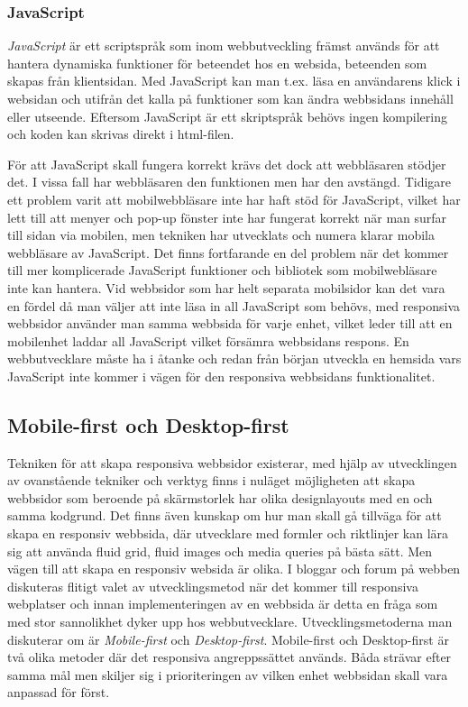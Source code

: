 \documentclass[11pt]{article}
\begin{document}
\subsubsection{JavaScript}
\textit{JavaScript} är ett scriptspråk som inom webbutveckling främst används för att hantera dynamiska funktioner för beteendet hos en websida, beteenden som skapas från klientsidan. Med JavaScript kan man t.ex. läsa en användarens klick i websidan och utifrån det kalla på funktioner som kan ändra webbsidans innehåll eller utseende. Eftersom JavaScript är ett skriptspråk behövs ingen kompilering och koden kan skrivas direkt i html-filen.

För att JavaScript skall fungera korrekt krävs det dock att webbläsaren stödjer det. I vissa fall har webbläsaren den funktionen men har den avstängd. Tidigare ett problem varit att mobilwebbläsare inte har haft stöd för JavaScript, vilket har lett till att menyer och pop-up fönster inte har fungerat korrekt när man surfar till sidan via mobilen, men tekniken har utvecklats och numera klarar mobila webbläsare av JavaScript. Det finns fortfarande en del problem när det kommer till mer komplicerade JavaScript funktioner och bibliotek som mobilwebläsare inte kan hantera. Vid webbsidor som har helt separata mobilsidor kan det vara en fördel då man väljer att inte läsa in all JavaScript som behövs, med responsiva webbsidor använder man samma webbsida för varje enhet, vilket leder till att en mobilenhet laddar all JavaScript vilket försämra webbsidans respons. En webbutvecklare måste ha i åtanke och redan från början utveckla en hemsida vars JavaScript inte kommer i vägen för den responsiva webbsidans funktionalitet.

\subsection{Mobile-first och Desktop-first}
Tekniken för att skapa responsiva webbsidor existerar, med hjälp av utvecklingen av ovanstående tekniker och verktyg finns i nuläget möjligheten att skapa webbsidor som beroende på skärmstorlek har olika designlayouts med en och samma kodgrund. Det finns även kunskap om hur man skall gå tillväga för att skapa en responsiv webbsida, där utvecklare med formler och riktlinjer kan lära sig att använda fluid grid, fluid images och media queries på bästa sätt. Men vägen till att skapa en responsiv websida är olika.  I bloggar och forum på webben diskuteras flitigt valet av utvecklingsmetod när det kommer till responsiva webplatser och innan implementeringen av en webbsida är detta en fråga som med stor sannolikhet dyker upp hos webbutvecklare. Utvecklingsmetoderna man diskuterar om är \textit{Mobile-first} och \textit{Desktop-first}. Mobile-first och Desktop-first är två olika metoder där det responsiva angreppssättet används. Båda strävar efter samma mål men skiljer sig i prioriteringen av vilken enhet webbsidan skall vara anpassad för först.
\end{document}
